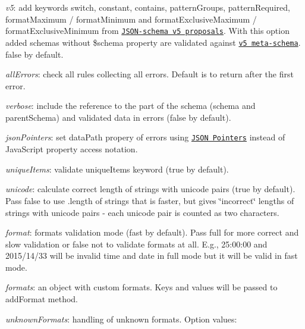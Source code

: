\begin{DoxyItemize}
\item {\itshape v5}\+: add keywords {\ttfamily switch}, {\ttfamily constant}, {\ttfamily contains}, {\ttfamily pattern\+Groups}, {\ttfamily pattern\+Required}, {\ttfamily format\+Maximum} / {\ttfamily format\+Minimum} and {\ttfamily format\+Exclusive\+Maximum} / {\ttfamily format\+Exclusive\+Minimum} from \href{https://github.com/json-schema/json-schema/wiki/v5-Proposals}{\tt J\+S\+O\+N-\/schema v5 proposals}. With this option added schemas without {\ttfamily \$schema} property are validated against \href{https://raw.githubusercontent.com/epoberezkin/ajv/master/lib/refs/json-schema-v5.json#}{\tt v5 meta-\/schema}. {\ttfamily false} by default.
\item {\itshape all\+Errors}\+: check all rules collecting all errors. Default is to return after the first error.
\item {\itshape verbose}\+: include the reference to the part of the schema ({\ttfamily schema} and {\ttfamily parent\+Schema}) and validated data in errors (false by default).
\item {\itshape json\+Pointers}\+: set {\ttfamily data\+Path} propery of errors using \href{https://tools.ietf.org/html/rfc6901}{\tt J\+S\+ON Pointers} instead of Java\+Script property access notation.
\item {\itshape unique\+Items}\+: validate {\ttfamily unique\+Items} keyword (true by default).
\item {\itshape unicode}\+: calculate correct length of strings with unicode pairs (true by default). Pass {\ttfamily false} to use {\ttfamily .length} of strings that is faster, but gives \char`\"{}incorrect\char`\"{} lengths of strings with unicode pairs -\/ each unicode pair is counted as two characters.
\item {\itshape format}\+: formats validation mode (\textquotesingle{}fast\textquotesingle{} by default). Pass \textquotesingle{}full\textquotesingle{} for more correct and slow validation or {\ttfamily false} not to validate formats at all. E.\+g., 25\+:00\+:00 and 2015/14/33 will be invalid time and date in \textquotesingle{}full\textquotesingle{} mode but it will be valid in \textquotesingle{}fast\textquotesingle{} mode.
\item {\itshape formats}\+: an object with custom formats. Keys and values will be passed to {\ttfamily add\+Format} method.
\item {\itshape unknown\+Formats}\+: handling of unknown formats. Option values\+:

\end{DoxyItemize}
